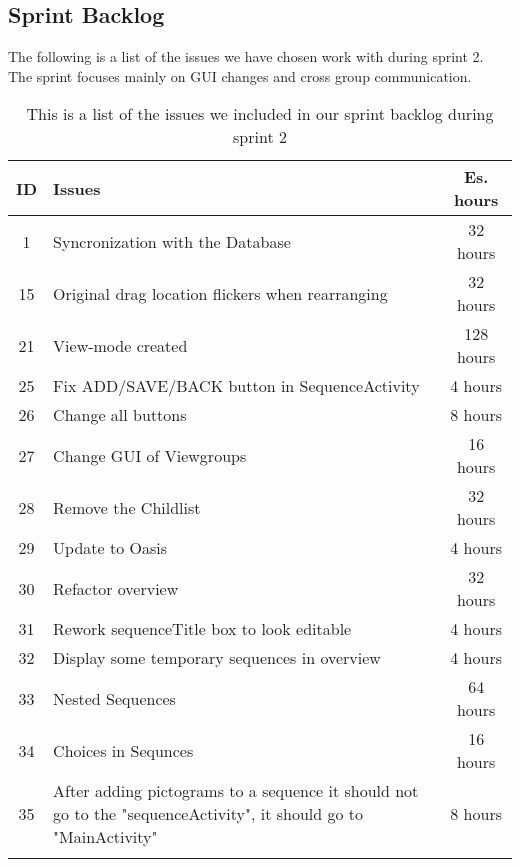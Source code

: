 \subsection{Sprint Backlog}\label{subsec:spr2_sprblog}
The following is a list of the issues we have chosen work with during sprint 2. The sprint focuses mainly on GUI changes and cross group communication.
\begin{longtable} { | c | p{12cm} | c | } 
\hline
	ID 	&	Issues	&		 Es. hours \\\hline
	1	& 	Syncronization with the Database	&	32 hours	\\\hline
	15	& 	Original drag location flickers when rearranging	&	32 hours	\\\hline
	21	& 	View-mode created	&	128 hours	\\\hline	
	25	& 	Fix ADD/SAVE/BACK button in SequenceActivity	&	4 hours	\\\hline
	26	& 	Change all buttons	&	8 hours	\\\hline
	27	& 	Change GUI of Viewgroups	&	16 hours	\\\hline
	28	& 	Remove the Childlist	&	32 hours	\\\hline
	29	& 	Update to Oasis	&	4 hours	\\\hline
	30	& 	Refactor overview	&	32 hours	\\\hline
	31	& 	Rework sequenceTitle box to look editable	&	4 hours	\\\hline
	32	& 	Display some temporary sequences in overview	&	4 hours	\\\hline
	33 	&	Nested Sequences	&	64 hours \\\hline
	34 	&	Choices in Sequnces	&	16 hours \\\hline
	35  &   After adding pictograms to a sequence it should not go to the "sequenceActivity", it should go to "MainActivity" & 8 hours \\\hline
\caption{This is a list of the issues we included in our sprint backlog during sprint 2}
\label{tab:spr2_sprintblog}
\end{longtable}